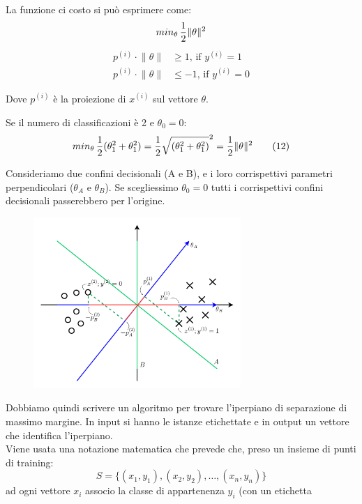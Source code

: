 \begin{definizione}
  La funzione ci costo si può esprimere come:
  \[min_\theta \, {1 \over 2 } \lVert \theta \rVert^2 \]
\begin{align*}
p^{(i)} \cdot \lVert \theta \rVert &\geq 1 \text{, if } y^{(i)}=1 \\
p^{(i)} \cdot \lVert \theta \rVert &\leq -1 \text{, if } y^{(i)}=0
\end{align*} %
\begin{nota}
Dove $p^{(i)}$ è la proiezione di $x^{(i)}$ sul vettore $\theta$.
\end{nota}
\end{definizione}
  \begin{esempio}
    Se il numero di classificazioni è 2 e $\theta_0 = 0$:
    \[min_\theta \, {1 \over 2 } (\theta_1^2 + \theta_1^2) = {1 \over 2 } \sqrt{(\theta_1^2 + \theta_1^2)}^2 =  {1 \over 2 } \lVert \theta \rVert^2 \tag{12} \label{12}\]
  \end{esempio}
Consideriamo due confini decisionali (A e B), e i loro corrispettivi parametri perpendicolari ($\theta_A$ e $\theta_B$). Se scegliessimo $\theta_0 = 0$ tutti i corrispettivi confini decisionali passerebbero per l'origine.
  \begin{figure}[H]
    \centering
    \includegraphics[width=0.7\textwidth]{img/fig-8-choosing-large-margin.png}
\end{figure}
Dobbiamo quindi scrivere un algoritmo per trovare l'iperpiano di separazione di
massimo margine. In input si hanno le istanze etichettate e in output un
vettore che identifica l'iperpiano.\\
Viene usata una notazione matematica che prevede che, preso un insieme di punti
di training:
\[S = \{(x_1,y_1), (x_2,y_2),\ldots, (x_n,y_n)\}\]
ad ogni vettore $x_i$ associo la classe di appartenenza $y_i$ (con un etichetta
